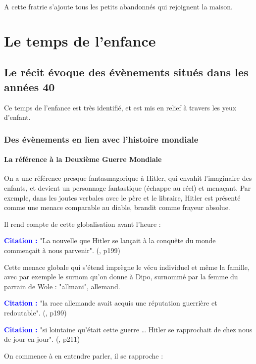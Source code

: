 \documentclass[a4paper, 11pt, hidelinks]{article}
\newcommand{\bs}{\bigskip}
\newcommand{\cit}{\large \textcolor{blue}{\textbf{Citation :}} \large }
\newcommand{\rb}[1]{\Romanbar{#1}}
\begin{document}
\bs
A cette fratrie s'ajoute tous les petits abandonnés qui rejoignent la maison.






\section{Le temps de l'enfance}


\subsection{Le récit évoque des évènements situés dans les années 40}
Ce temps de l'enfance est très identifié, et est mis en relief à travers les yeux d'enfant.



\subsubsection{Des évènements en lien avec l'histoire mondiale}



\paragraph{La référence à la Deuxième Guerre Mondiale}


On a une référence presque fantasmagorique à Hitler, qui envahit l'imaginaire des enfants, et devient
un personnage fantastique (échappe au réel) et menaçant.
Par exemple, dans les joutes verbales avec le père et le libraire, Hitler est présenté comme une menace
comparable au diable, brandit comme frayeur absolue.
\smallskip

Il rend compte de cette globalisation avant l'heure :

\cit "La nouvelle que Hitler se lançait à la conquête du monde commençait à nous parvenir". (\rb{7}, p199)

\bs

Cette menace globale qui s'étend imprègne le vécu individuel et même la famille, avec par exemple le
surnom qu'on donne à Dipo, surnommé par la femme du parrain de Wole : "allmani", allemand.


\cit "la race allemande avait acquis une réputation guerrière et redoutable". (\rb{7}, p199)


\cit "si lointaine qu'était cette guerre … Hitler se rapprochait de chez nous de jour en jour". (\rb{8}, p211)

\bs
On commence à en entendre parler, il se rapproche :
\end{document}
